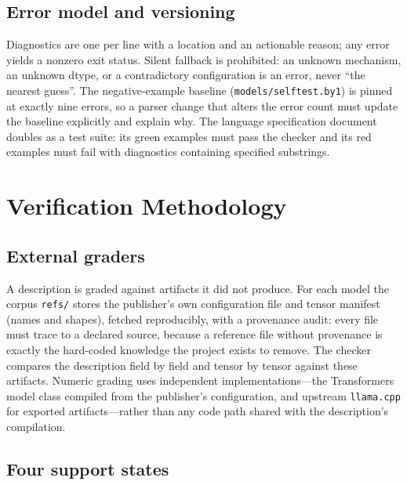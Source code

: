 \documentclass[11pt,a4paper]{article}
\newcommand{\code}[1]{\texttt{#1}}
\newcommand{\q}[1]{\textquotedblleft #1\textquotedblright}
\begin{document}
\subsection{Error model and versioning}

Diagnostics are one per line with a location and an actionable reason; any
error yields a nonzero exit status. Silent fallback is prohibited: an unknown
mechanism, an unknown dtype, or a contradictory configuration is an error,
never \q{the nearest guess}. The negative-example baseline
(\code{models/selftest.by1}) is pinned at exactly nine errors, so a parser
change that alters the error count must update the baseline explicitly and
explain why. The language specification document doubles as a test suite: its
green examples must pass the checker and its red examples must fail with
diagnostics containing specified substrings.

\section{Verification Methodology}
\label{sec:verify}

\subsection{External graders}

A description is graded against artifacts it did not produce. For each model
the corpus \code{refs/} stores the publisher's own configuration file and
tensor manifest (names and shapes), fetched reproducibly, with a provenance
audit: every file must trace to a declared source, because a reference file
without provenance is exactly the hard-coded knowledge the project exists to
remove. The checker compares the description field by field and tensor by
tensor against these artifacts. Numeric grading uses independent
implementations---the Transformers model class compiled from the publisher's
configuration, and upstream \code{llama.cpp} for exported artifacts---rather
than any code path shared with the description's compilation.

\subsection{Four support states}
\end{document}
